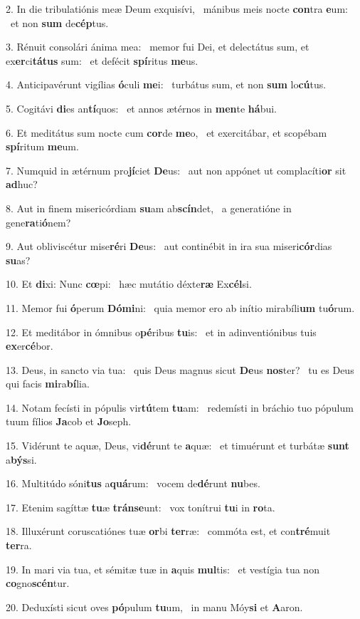 2. In die tribulatiónis meæ Deum exquisívi, \dag\  mánibus meis nocte \textbf{con}tra \textbf{e}um: \ast\  et non \textbf{sum} de\textbf{cép}tus.\

3. Rénuit consolári ánima mea: \dag\  memor fui Dei, et delectátus sum, et ex\textbf{er}ci\textbf{tá}\textbf{tus} sum: \ast\  et defécit \textbf{spí}ritus \textbf{me}us.\

4. Anticipavérunt vigílias \textbf{ó}culi \textbf{me}i: \ast\  turbátus sum, et non \textbf{sum} lo\textbf{cú}tus.\

5. Cogitávi \textbf{di}es an\textbf{tí}quos: \ast\  et annos ætérnos in \textbf{men}te \textbf{há}bui.\

6. Et meditátus sum nocte cum \textbf{cor}de \textbf{me}o, \ast\  et exercitábar, et scopébam \textbf{spí}ritum \textbf{me}um.\

7. Numquid in ætérnum pro\textbf{jí}ciet \textbf{De}us: \ast\  aut non appónet ut complacíti\textbf{or} sit \textbf{ad}huc?\

8. Aut in finem misericórdiam \textbf{su}am ab\textbf{scín}det, \ast\  a generatióne in gene\textbf{ra}ti\textbf{ó}nem?\

9. Aut obliviscétur mise\textbf{ré}ri \textbf{De}us: \ast\  aut continébit in ira sua miseri\textbf{cór}dias \textbf{su}as?\

10. Et \textbf{di}xi: Nunc \textbf{cœ}pi: \ast\  hæc mutátio déxte\textbf{ræ} Ex\textbf{cél}si.\

11. Memor fui \textbf{ó}perum \textbf{Dó}\textbf{mi}ni: \ast\  quia memor ero ab inítio mirabíli\textbf{um} tu\textbf{ó}rum.\

12. Et meditábor in ómnibus o\textbf{pé}ribus \textbf{tu}is: \ast\  et in adinventiónibus tuis \textbf{ex}er\textbf{cé}bor.\

13. Deus, in sancto via tua: \dag\  quis Deus magnus sicut \textbf{De}us \textbf{nos}ter? \ast\  tu es Deus qui facis \textbf{mi}ra\textbf{bí}lia.\

14. Notam fecísti in pópulis vir\textbf{tú}tem \textbf{tu}am: \ast\  redemísti in bráchio tuo pópulum tuum fílios \textbf{Ja}cob et \textbf{Jo}seph.\

15. Vidérunt te aquæ, Deus, vi\textbf{dé}runt te \textbf{a}quæ: \ast\  et timuérunt et turbátæ \textbf{sunt} a\textbf{býs}si.\

16. Multitúdo sóni\textbf{tus} a\textbf{quá}rum: \ast\  vocem de\textbf{dé}runt \textbf{nu}bes.\

17. Etenim sagíttæ \textbf{tu}æ \textbf{tráns}\textbf{e}unt: \ast\  vox tonítrui \textbf{tu}i in \textbf{ro}ta.\

18. Illuxérunt coruscatiónes tuæ \textbf{or}bi \textbf{ter}ræ: \ast\  commóta est, et con\textbf{tré}muit \textbf{ter}ra.\

19. In mari via tua, et sémitæ tuæ in \textbf{a}quis \textbf{mul}tis: \ast\  et vestígia tua non \textbf{co}gno\textbf{scén}tur.\

20. Deduxísti sicut oves \textbf{pó}pulum \textbf{tu}um, \ast\  in manu Móy\textbf{si} et \textbf{A}aron.\

